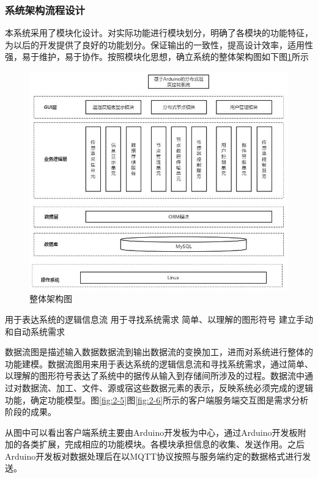 \subsubsection{系统架构流程设计}

本系统采用了模块化设计。对实际功能进行模块划分，明确了各模块的功能特征，为以后的开发提供了良好的功能划分。保证输出的一致性，提高设计效率，适用性强，易于维护，易于协作。按照模块化思想，确立系统的整体架构图如下图\ref{fig:2-4}所示

\begin{figure}[htbp]
	\centering
	\includegraphics[width=1\linewidth]{figure/2-4}
	\caption{整体架构图}
	\label{fig:2-4}
\end{figure}

用于表达系统的逻辑信息流
用于寻找系统需求
简单、以理解的图形符号
建立手动和自动系统需求

数据流图是描述输入数据数据流到输出数据流的变换加工，进而对系统进行整体的功能建模。数据流图用来用于表达系统的逻辑信息流和寻找系统需求，通过简单、以理解的图形符号表达了系统中的据传从输入到存储间所涉及的过程。数据流中通过对数据流、加工、文件、源或宿这些数据元素的表示，反映系统必须完成的逻辑功能，确定功能模型。图\ref{fig:2-5}图\ref{fig:2-6}所示的客户端服务端交互图是需求分析阶段的成果。

从图中可以看出客户端系统主要由Arduino开发板为中心，通过Arduino开发板附加的各类扩展，完成相应的功能模块。各模块承担信息的收集、发送作用。之后Arduino开发板对数据处理后在以MQTT协议按照与服务端约定的数据格式进行发送。

